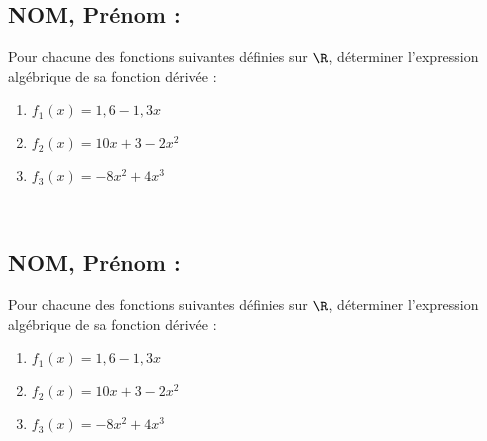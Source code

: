\documentclass[a4paper,11pt,exos]{nsi} %
\begin{document}
\subsection*{NOM, Prénom : \dotfill} 


\maketitle




\begin{exercice}
    Pour chacune des fonctions suivantes définies sur $\R$, déterminer l'expression algébrique de sa fonction dérivée :
    \begin{multicols}{3}
        \begin{enumerate}
            \item $f_1(x)=1{,}6-1{,}3x$
        
            \item $f_2(x)= 10x+3-2x^2$
            \item $f_3(x)= -8x^2+4x^3$
        \end{enumerate}
    \end{multicols}
    
    \end{exercice}

\\



\subsection*{NOM, Prénom : \dotfill} 


\maketitle




\begin{exercice}
    Pour chacune des fonctions suivantes définies sur $\R$, déterminer l'expression algébrique de sa fonction dérivée :
    \begin{multicols}{3}
        \begin{enumerate}
            \item $f_1(x)=1{,}6-1{,}3x$
        
            \item $f_2(x)= 10x+3-2x^2$
            \item $f_3(x)= -8x^2+4x^3$
        \end{enumerate}
    \end{multicols}
    
    \end{exercice}

\end{document}
